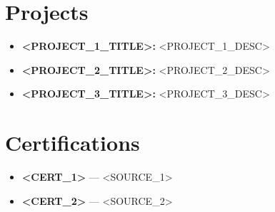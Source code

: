 \documentclass[a4paper,10pt]{article}
\begin{document}
\section*{Projects}
\begin{itemize}
    \item \textbf{<PROJECT_1_TITLE>:} <PROJECT_1_DESC>
    \item \textbf{<PROJECT_2_TITLE>:} <PROJECT_2_DESC>
    \item \textbf{<PROJECT_3_TITLE>:} <PROJECT_3_DESC>
\end{itemize}

\section*{Certifications}
\begin{itemize}
    \item \textbf{<CERT_1>} — <SOURCE_1>
    \item \textbf{<CERT_2>} — <SOURCE_2>
\end{itemize}
\end{document}
